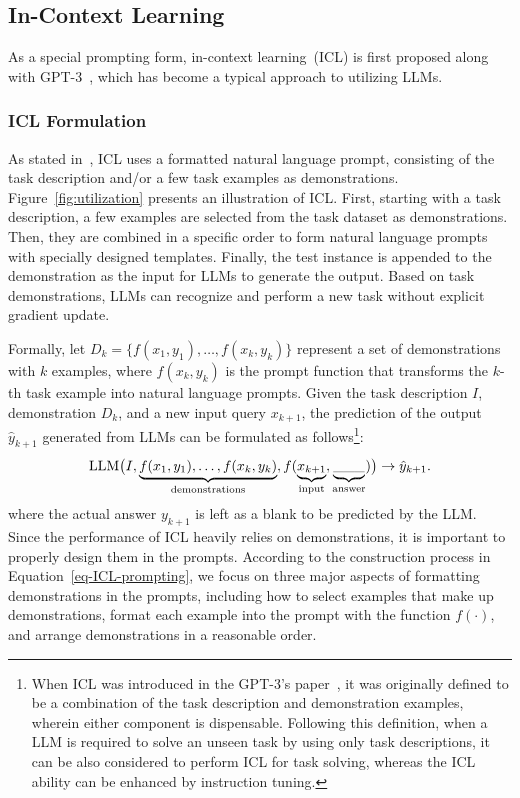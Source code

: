 \subsection{In-Context Learning}
\label{subsec-icl}
As a special prompting form, in-context learning~(ICL) is first proposed along with GPT-3~\cite{Brown-NeurIPS-2020-Language}, which has become a typical approach to utilizing LLMs. 

\subsubsection{ICL Formulation}
\label{subsubsec-icl-formulation}

As stated in~\cite{Brown-NeurIPS-2020-Language}, ICL uses a formatted natural language prompt, consisting of the task description and/or a few task examples as demonstrations.
Figure~\ref{fig:utilization} presents an illustration of ICL.
First, starting with a task description, a few examples are selected from the task dataset as demonstrations.
Then, they are combined in a specific order to form natural language prompts with specially designed templates.
Finally, the test instance is appended to the demonstration as the input for LLMs to generate the output.
Based on task demonstrations, LLMs can recognize and perform a new task without explicit gradient update.

Formally, let $D_k = \{ f(x_1, y_1), \dots, f(x_k, y_k) \}$ represent a set of demonstrations with $k$ examples, where $f(x_k, y_k)$ is the prompt function that transforms the $k$-th task example into natural language prompts.
Given the task description $I$, demonstration $D_k$, and a new input query $x_{k+1}$, the prediction of the output $\hat{y}_{k+1}$ generated from LLMs can be formulated as follows\footnote{
When ICL was introduced in the GPT-3's paper~\cite{Brown-NeurIPS-2020-Language}, it was originally defined to be a combination of the task description and demonstration examples, wherein either component is dispensable. Following this definition, when a LLM is required to solve an unseen task by using only task descriptions, it can be also considered to perform ICL for task solving, whereas the ICL ability can be enhanced by instruction tuning.   
}: 
\begin{equation}\label{eq-ICL-prompting}
     \text{LLM} \big(I, \underbrace{ f(x_1, y_1), \dots, f(x_k, y_k)}_{\text{demonstrations}}, f(\underbrace{x_{k+1}}_{\text{input}}, \underbrace{\vphantom{\hat{y}_{k+1}} \_\_\_}_{\text{answer}}) \big) \rightarrow \hat{y}_{k+1}.
\end{equation}
where the actual answer $y_{k+1}$ is left as a blank to be predicted by the  LLM. %
Since the performance of ICL heavily relies on demonstrations, it is important to properly design them in the prompts. 
According to the construction process in Equation~\eqref{eq-ICL-prompting}, we focus on three major aspects of formatting demonstrations in the prompts, including how to select examples that make up demonstrations, format each example into the prompt with the function $f(\cdot)$, and arrange demonstrations in a reasonable order.  

